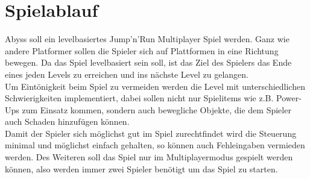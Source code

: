 \section{Spielablauf}
\label{sec:grundlagen:spielgrundlagen}
Abyss soll ein levelbasiertes Jump'n'Run Multiplayer Spiel werden. \newline
Ganz wie andere Platformer sollen die Spieler sich auf Plattformen in eine Richtung bewegen. Da das Spiel levelbasiert sein soll, ist das Ziel des Spielers das Ende eines jeden Levels zu erreichen und ins nächste Level zu gelangen. \\
Um Eintönigkeit beim Spiel zu vermeiden werden die Level mit unterschiedlichen Schwierigkeiten implementiert, dabei sollen nicht nur Spielitems wie z.B. Power-Ups zum Einsatz kommen, sondern auch bewegliche Objekte, die dem Spieler auch Schaden hinzufügen können. \\
Damit der Spieler sich möglichst gut im Spiel zurechtfindet wird die Steuerung minimal und möglichst einfach gehalten, so können auch Fehleingaben vermieden werden. Des Weiteren soll das Spiel nur im Multiplayermodus gespielt werden können, also werden immer zwei Spieler benötigt um das Spiel zu starten. 